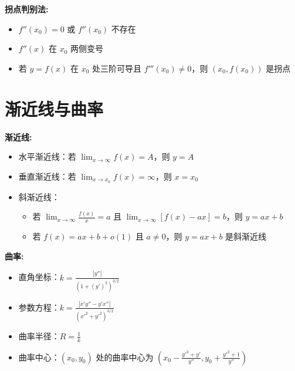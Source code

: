 \documentclass[10pt]{article}
\begin{document}
\begin{multicols*}{2}
\textbf{拐点判别法:}
\begin{itemize}
  \item \(f''(x_0) = 0\) 或 \(f''(x_0)\) 不存在
  \item \(f''(x)\) 在 \(x_0\) 两侧变号
  \item 若 \(y = f(x)\) 在 \(x_0\) 处三阶可导且 \(f'''(x_0) \neq 0\)，则 \((x_0, f(x_0))\) 是拐点
\end{itemize}

\section*{渐近线与曲率}
\vspace{-8pt}

\textbf{渐近线:}
\begin{itemize}
  \item 水平渐近线：若 \(\lim_{x \to \infty} f(x) = A\)，则 \(y = A\)
  \item 垂直渐近线：若 \(\lim_{x \to x_0} f(x) = \infty\)，则 \(x = x_0\)
  \item 斜渐近线：
    \begin{itemize}
      \item 若 \(\lim_{x \to \infty} \frac{f(x)}{x} = a\) 且 \(\lim_{x \to \infty} [f(x) - ax] = b\)，则 \(y = ax + b\)
      \item 若 \(f(x) = ax + b + o(1)\) 且 \(a \neq 0\)，则 \(y = ax + b\) 是斜渐近线
    \end{itemize}
\end{itemize}

\textbf{曲率:}
\begin{itemize}
  \item 直角坐标：\(k = \frac{|y''|}{(1 + (y')^2)^{3/2}}\)
  \item 参数方程：\(k = \frac{|x'y'' - y'x''|}{(x'^2 + y'^2)^{3/2}}\)
  \item 曲率半径：\(R = \frac{1}{k}\)
  \item 曲率中心：\((x_0, y_0)\) 处的曲率中心为 \((x_0 - \frac{y'^3 + y'}{y''} , y_0 + \frac{y'^2 + 1}{y''})\)
\end{itemize}

\end{multicols*}
\end{document}
